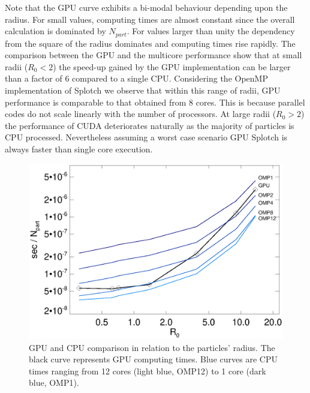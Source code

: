 \documentclass[smallextended]{svjour3}
\begin{document}
Note that the GPU curve exhibits a bi-modal behaviour depending upon the radius. For small values, computing times are almost constant since the overall calculation is dominated by $N_{part}$. For values larger than unity the dependency from the square of the radius dominates and computing times rise rapidly. The comparison between the GPU and the multicore performance show that at small radii ($R_0 < 2$) the speed-up gained by the GPU implementation can be larger than a factor of 6 compared to a single CPU. Considering the OpenMP implementation of Splotch we observe that within this range of radii, GPU performance is comparable to that obtained from 8 cores. This is because parallel codes do not scale linearly with the number of processors. At large radii ($R_0 > 2$) the performance of CUDA deteriorates naturally as the majority of particles is CPU processed. Nevertheless assuming a worst case scenario GPU Splotch is always faster than single core execution. 

\begin{figure}
\includegraphics[scale=0.5]{scalaomp.eps}
\caption{GPU and CPU comparison in relation to the particles' radius. The black curve represents GPU computing times. Blue curves are CPU times ranging from 12 cores (light blue, OMP12) to 1 core (dark blue, OMP1).}
\label{fig:gpucpu}
\end{figure}
\end{document}
